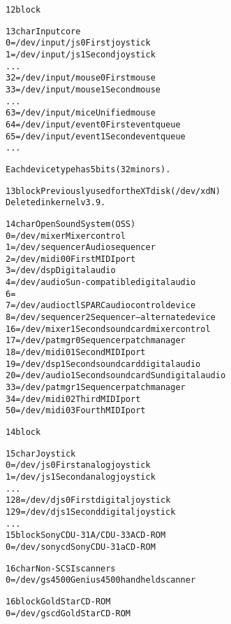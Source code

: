 \documentclass[a4paper,8pt,english]{sphinxmanual}
\begin{document}
\begin{alltt}
  12 block

  13 char       Input core
                  0 = /dev/input/js0    First joystick
                  1 = /dev/input/js1    Second joystick
                    ...
                 32 = /dev/input/mouse0 First mouse
                 33 = /dev/input/mouse1 Second mouse
                    ...
                 63 = /dev/input/mice   Unified mouse
                 64 = /dev/input/event0 First event queue
                 65 = /dev/input/event1 Second event queue
                    ...

                Each device type has 5 bits (32 minors).

  13 block      Previously used for the XT disk (/dev/xdN)
                Deleted in kernel v3.9.

  14 char       Open Sound System (OSS)
                  0 = /dev/mixer        Mixer control
                  1 = /dev/sequencer    Audio sequencer
                  2 = /dev/midi00       First MIDI port
                  3 = /dev/dsp          Digital audio
                  4 = /dev/audio        Sun-compatible digital audio
                  6 =
                  7 = /dev/audioctl     SPARC audio control device
                  8 = /dev/sequencer2   Sequencer -- alternate device
                 16 = /dev/mixer1       Second soundcard mixer control
                 17 = /dev/patmgr0      Sequencer patch manager
                 18 = /dev/midi01       Second MIDI port
                 19 = /dev/dsp1         Second soundcard digital audio
                 20 = /dev/audio1       Second soundcard Sun digital audio
                 33 = /dev/patmgr1      Sequencer patch manager
                 34 = /dev/midi02       Third MIDI port
                 50 = /dev/midi03       Fourth MIDI port

  14 block

  15 char       Joystick
                  0 = /dev/js0          First analog joystick
                  1 = /dev/js1          Second analog joystick
                    ...
                128 = /dev/djs0         First digital joystick
                129 = /dev/djs1         Second digital joystick
                    ...
  15 block      Sony CDU-31A/CDU-33A CD-ROM
                  0 = /dev/sonycd       Sony CDU-31a CD-ROM

  16 char       Non-SCSI scanners
                  0 = /dev/gs4500       Genius 4500 handheld scanner

  16 block      GoldStar CD-ROM
                  0 = /dev/gscd         GoldStar CD-ROM


\end{alltt}
\end{document}
